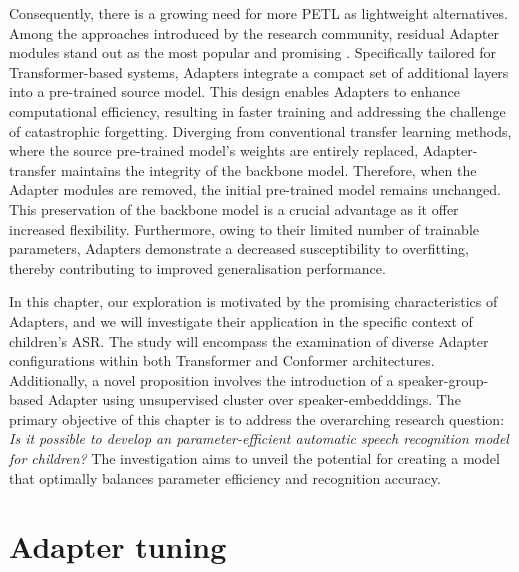 Consequently, there is a growing need for more \ac{PETL} as lightweight alternatives.
 Among the approaches introduced by the research community, residual Adapter modules stand out as the most popular and promising \cite{houlsby, pfeiffer}. Specifically tailored for Transformer-based systems, Adapters integrate a compact set of additional layers into a pre-trained source model. This design enables Adapters to enhance computational efficiency, resulting in faster training and addressing the challenge of catastrophic forgetting. Diverging from conventional transfer learning methods, where the source pre-trained model's weights are entirely replaced, Adapter-transfer maintains the integrity of the backbone model. Therefore, when the Adapter modules are removed, the initial pre-trained model remains unchanged. This preservation of the backbone model is a crucial advantage  as it offer increased flexibility. Furthermore, owing to their limited number of trainable parameters, Adapters demonstrate a decreased susceptibility to overfitting, thereby contributing to improved generalisation performance.

 In this chapter, our exploration is motivated by the promising characteristics of Adapters, and we will investigate their application in the specific context of children's \ac{ASR}. The study will encompass the examination of diverse Adapter configurations within both Transformer and Conformer architectures. Additionally, a novel proposition involves the introduction of a speaker-group-based Adapter using unsupervised cluster over speaker-embedddings.
The primary objective of this chapter is to address the overarching research question: \textit{Is it possible to develop an parameter-efficient automatic speech recognition model for children?} The investigation aims to unveil the potential for creating a model that optimally balances parameter efficiency and recognition accuracy. 

\section{Adapter tuning}

